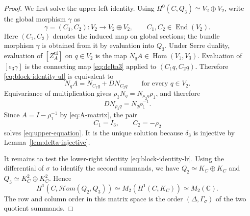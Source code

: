 \documentclass[11pt,a4paper,dvipsnames]{amsart}
\numberwithin{equation}{section}
\theoremstyle{plain}
\theoremstyle{definition}
\newcommand{\End}{\operatorname{End}}
\newcommand{\Hom}{\operatorname{Hom}}
\newcommand{\CC}{\mathbb C}
\newcommand{\cHom}{\mathcal{H}om}
\begin{document}
\begin{proof}
We first solve the upper-left identity.  Using
$H^0(C,Q_3)\simeq V_2\oplus V_2$, write the global morphism $\gamma$ as
\begin{equation}\label{eq:gamma-C1C2}
 \gamma=(C_1,C_2):V_2\longrightarrow V_2\oplus V_2,
 \qquad C_1,C_2\in\End(V_2).
\end{equation}
Here $(C_1,C_2)$ denotes the induced map on global sections;
the bundle morphism $\gamma$ is obtained from it by evaluation into $Q_3$.
Under Serre duality, evaluation of
$[Z_A^{\mathrm{ul}}]$ on $q\in V_2$ is the map
$N_qA\in\Hom(V_1,V_3)$.  Evaluation of $[e_3\gamma]$ is the connecting
map \eqref{eq:delta3} applied to $(C_1q,C_2q)$.  Therefore
\eqref{eq:block-identity-ul} is equivalent to
\begin{equation}\label{eq:upper-equation}
 N_qA=N_{C_1q}+DN_{C_2q}
 \qquad\text{for every }q\in V_2.
\end{equation}
Equivariance of multiplication gives
$\rho_3N_q=N_{\rho_2q}\rho_1$, and therefore
$$
 DN_{\rho_2q}=N_q\rho_1^{-1}.
$$
Since $A=I-\rho_1^{-1}$ by \eqref{eq:A-matrix}, the pair
\begin{equation}\label{eq:C1C2}
 C_1=I_3,
 \qquad
 C_2=-\rho_2
\end{equation}
solves \eqref{eq:upper-equation}.  It is the unique solution because
$\delta_3$ is injective by Lemma~\ref{lem:delta-injective}.

It remains to test the lower-right identity
\eqref{eq:block-identity-lr}.  Using the differential of $\sigma$ to
identify the second summands, we have
$Q_2\simeq K_C\oplus K_C$ and
$Q_3\simeq K_C^2\oplus K_C^2$.  Hence
\begin{equation}\label{eq:lower-target}
 H^1\!\left(C,\cHom(Q_2,Q_3)\right)
 \simeq M_2\!\left(H^1(C,K_C)\right)
 \simeq M_2(\CC).
\end{equation}
The row and column order in this matrix space is the order
$(\Delta,\Gamma_\sigma)$ of the two quotient summands.


\end{proof}
\end{document}
